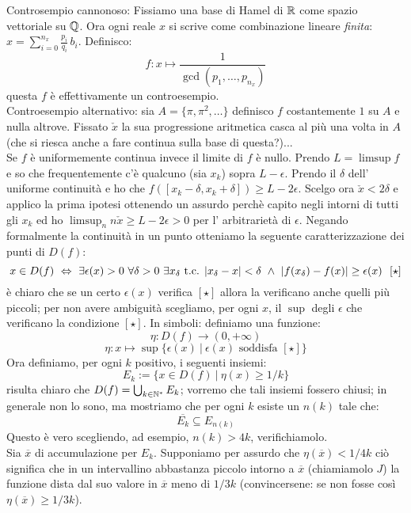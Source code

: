 Controsempio cannonoso: Fissiamo una base di Hamel di $\mathbb{R}$ come spazio vettoriale su $\mathbb{Q}$. Ora ogni reale $x$ si scrive come combinazione lineare {\it finita}: $x=\sum_{i=0}^{n_x} \frac{p_i}{q_i}\, b_i$. Definisco:
$$ f:x\mapsto \frac{1}{\gcd(p_1,\ldots,p_{n_x})} $$ 
questa $f$ è effettivamente un controesempio.\\
Controesempio alternativo: sia $A=\{\pi,\pi^2,\ldots\}$ definisco $f$ costantemente $1$ su $A$ e nulla altrove. Fissato $\check{x}$ la sua progressione aritmetica casca al più una volta in $A$ (che si riesca anche a fare continua sulla base di questa?)...\\
Se $f$ è uniformemente continua invece il limite di $f$ è nullo. Prendo $L=\limsup f$ e so che frequentemente c'è qualcuno (sia $x_k$) sopra $L-\epsilon$. Prendo il $\delta$ dell' uniforme continuità e ho che $f([x_k-\delta,x_k+\delta])\ge L-2\epsilon$. Scelgo ora $\check{x}<2\delta$ e applico la prima ipotesi ottenendo un assurdo perchè capito negli intorni di tutti gli $x_k$ ed ho $\limsup_n n\check{x}\ge L-2\epsilon>0$ per l' arbitrarietà di $\epsilon$.
 Negando formalmente la continuità in un punto otteniamo la seguente caratterizzazione dei punti di $D(f)$:
$$
x\in D(f)\ \Leftrightarrow\  \exists \epsilon(x)>0\  \forall \delta>0\  \exists x_\delta \mbox{ t.c. } \vert{x_\delta-x}\vert<\delta\  \wedge\   \vert{f(x_\delta)-f(x)}\vert\geq \epsilon(x)\ \ [\star]
$$
è chiaro che se un certo $\epsilon(x)$ verifica $[\star]$ allora la verificano anche quelli più piccoli; per non avere ambiguità scegliamo, per ogni $x$, il $\sup$ degli $\epsilon$ che verificano la condizione $[\star]$. In simboli: definiamo una funzione:
$$
\eta: D(f)\rightarrow (0,+\infty)
$$
$$
\eta: x\mapsto \sup\{\epsilon(x)\ \vert\ \epsilon(x) \mbox{ soddisfa } [\star] \}
$$
Ora definiamo, per ogni $k$ positivo, i seguenti insiemi:
$$
E_k:=\{x\in D(f)\ \vert\  \eta(x)\geq 1/k \}
$$
risulta chiaro che $D(f)=\bigcup_{k\in\mathbb{N}^{*}} E_k$; vorremo che tali insiemi fossero chiusi; in generale non lo sono, ma mostriamo che per ogni $k$ esiste un $n(k)$ tale che:
$$
\overline{E_k}\subseteq E_{n(k)}
$$
Questo è vero scegliendo, ad esempio, $n(k)>4k$, verifichiamolo.\\
Sia $\overline{x}$ di accumulazione per $E_k$. Supponiamo per assurdo che $\eta(\overline{x})<1/4k$ ciò significa che in un intervallino abbastanza piccolo intorno a $\overline{x}$ (chiamiamolo $J$) la funzione dista dal suo valore in $\overline{x}$ meno di $1/3k$ (convincersene: se non fosse così $\eta(\overline{x})\geq 1/3k$).\\

